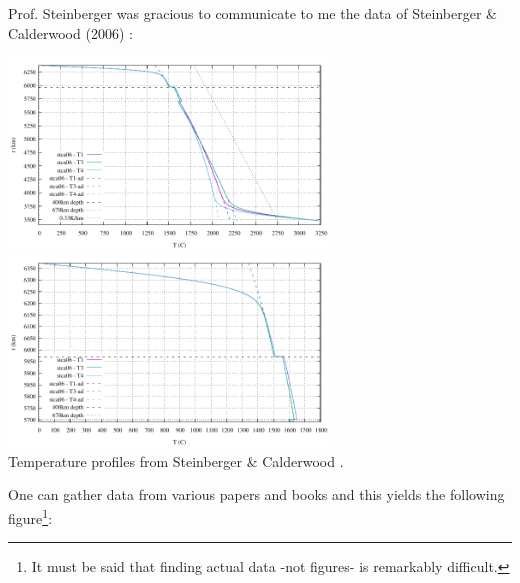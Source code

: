 Prof. Steinberger was gracious to communicate to me the data of Steinberger \& Calderwood (2006) \cite{stca06}:
\begin{center}
\includegraphics[width=8.5cm]{images/adiabatic/steinberger/Tprofile.pdf}
\includegraphics[width=8.5cm]{images/adiabatic/steinberger/Tprofile_upper.pdf}\\
{\captionfont Temperature profiles from Steinberger \& Calderwood \cite{stca06}.}
\end{center}

One can gather data from various papers and books and this yields the following 
figure\footnote{It must be said that finding actual data -not figures- is remarkably difficult.}:

